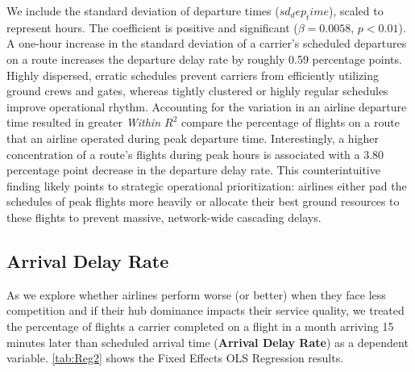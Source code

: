 \documentclass[preprint,12pt,authoryear]{elsarticle}
\begin{document}
We include the standard deviation of departure times ($sd_dep_time$), scaled to represent hours. The coefficient is positive and significant ($\beta = 0.0058$, $p < 0.01$). A one-hour increase in the standard deviation of a carrier's scheduled departures on a route increases the departure delay rate by roughly 0.59 percentage points. Highly dispersed, erratic schedules prevent carriers from efficiently utilizing ground crews and gates, whereas tightly clustered or highly regular schedules improve operational rhythm. Accounting for the variation in an airline departure time resulted in greater \textit{Within $R^2$} compare the percentage of flights on a route that an airline operated during peak departure time. Interestingly, a higher concentration of a route's flights during peak hours is associated with a 3.80 percentage point decrease in the departure delay rate. This counterintuitive finding likely points to strategic operational prioritization: airlines either pad the schedules of peak flights more heavily or allocate their best ground resources to these flights to prevent massive, network-wide cascading delays.




\subsection{Arrival Delay Rate}

As we explore whether airlines perform worse (or better) when they face less competition and if their hub dominance impacts their service quality, we treated the percentage of flights a carrier completed on a flight in a month arriving 15 minutes later than scheduled arrival time (\textbf{Arrival Delay Rate}) as a dependent variable. \autoref{tab:Reg2} shows the Fixed Effects OLS Regression results.  
\end{document}
